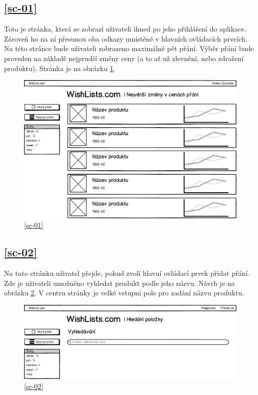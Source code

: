 \subsection{\ref{sc-01}}
Toto je stránka, která se zobrazí uživateli ihned po jeho přihlášení do aplikace. Zároveň ho na ní přesunou oba odkazy umístěné v hlavních ovládacích prvcích. Na této stránce bude uživateli zobrazeno maximálně pět přání. Výběr přání bude proveden na základě nejprudší změny ceny (a to ať už zlevnění, nebo zdražení produktu). Stránka je na obrázku \ref{fig:uvodni-prihlaseny-uzivatel}.

\begin{figure}[htb]
\begin{center}
\includegraphics[width=130mm]{./pictures/mock/uvodni-prihlaseny-uzivatel.png}
\caption{\ref{sc-01}}
\label{fig:uvodni-prihlaseny-uzivatel}
\end{center}
\end{figure}

\subsection{\ref{sc-02}}
Na tuto stránku uživatel přejde, pokud zvolí hlavní ovládací prvek přidat přání. Zde je uživateli umožněno vyhledat produkt podle jeho názvu. Návrh je na obrázku \ref{fig:vyhledavani}. V centru stránky je velké vstupní pole pro zadání názvu produktu.

\begin{figure}[htb]
\begin{center}
\includegraphics[width=130mm]{./pictures/mock/vyhledavani.png}
\caption{\ref{sc-02}}
\label{fig:vyhledavani}
\end{center}
\end{figure}

